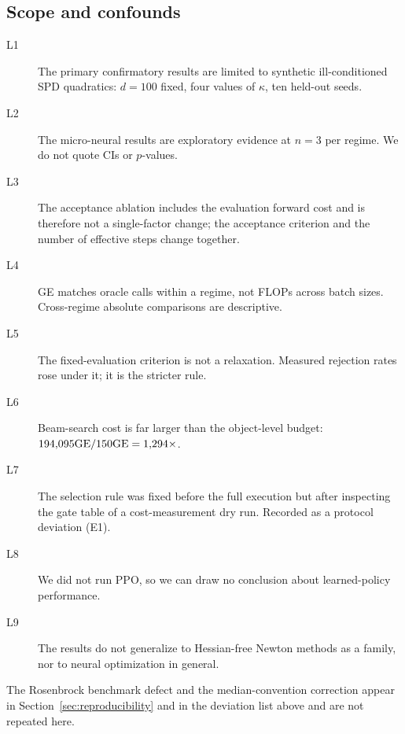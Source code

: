 \subsection{Scope and confounds}
\label{sec:scope}

\begin{description}
  \item[L1] The primary confirmatory results are limited to synthetic ill-conditioned
    SPD quadratics: $d = 100$ fixed, four values of $\kappa$, ten held-out seeds.
  \item[L2] The micro-neural results are exploratory evidence at $n = 3$ per regime.
    We do not quote CIs or $p$-values.
  \item[L3] The acceptance ablation includes the evaluation forward cost and is
    therefore not a single-factor change; the acceptance criterion and the number of
    effective steps change together.
  \item[L4] GE matches oracle calls within a regime, not FLOPs across batch sizes.
    Cross-regime absolute comparisons are descriptive.
  \item[L5] The fixed-evaluation criterion is not a relaxation. Measured rejection
    rates rose under it; it is the stricter rule.
  \item[L6] Beam-search cost is far larger than the object-level budget:
    $194{,}095 \text{GE} / 150 \text{GE} = 1{,}294\times$.
  \item[L7] The selection rule was fixed before the full execution but after
    inspecting the gate table of a cost-measurement dry run. Recorded as a protocol
    deviation (E1).
  \item[L8] We did not run PPO, so we can draw no conclusion about learned-policy
    performance.
  \item[L9] The results do not generalize to Hessian-free Newton methods as a family,
    nor to neural optimization in general.
\end{description}

The Rosenbrock benchmark defect and the median-convention correction appear in
Section~\ref{sec:reproducibility} and in the deviation list above and are not
repeated here.
